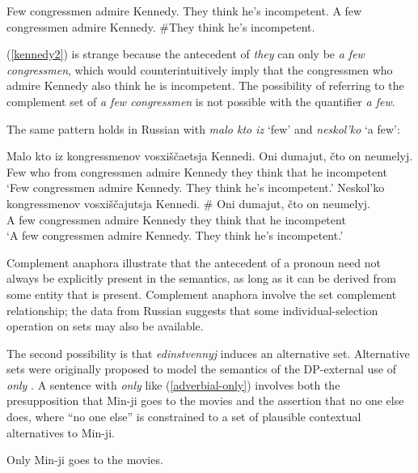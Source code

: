 \begin{exe}
	\ex \label{kennedy} Few congressmen admire Kennedy. They think he's incompetent.
	\ex \label{kennedy2} A few congressmen admire Kennedy. \#They think he's incompetent.
\end{exe}

(\ref{kennedy2}) is strange because the antecedent of \textit{they} can only be \textit{a few congressmen}, which would counterintuitively imply that the congressmen who admire Kennedy also think he is incompetent. The possibility of referring to the complement set of \textit{a few congressmen} is not possible with the quantifier \textit{a few}.

The same pattern holds in Russian with \textit{malo kto iz} `few' and \textit{neskol'ko} `a few':

\begin{exe}
	\ex \gll Malo kto iz kongressmenov vosxi\v{s}\v{c}aetsja Kennedi. Oni dumajut, \v{c}to on neumelyj.\\
	Few who from congressmen admire Kennedy they think that he incompetent\\
	\glt `Few congressmen admire Kennedy. They think he's incompetent.'
	\ex \gll Neskol'ko kongressmenov vosxi\v{s}\v{c}ajutsja Kennedi. \# Oni dumajut, \v{c}to on neumelyj.\\
	{A few} congressmen admire Kennedy {} they think that he incompetent\\
	\glt `A few congressmen admire Kennedy. They think he's incompetent.'
\end{exe}

Complement anaphora illustrate that the antecedent of a pronoun need not always be explicitly present in the semantics, as long as it can be derived from some entity that is present. Complement anaphora involve the set complement relationship; the data from Russian suggests that some individual-selection operation on sets may also be available.

The second possibility is that \textit{edinstvennyj} induces an alternative set. Alternative sets were originally proposed to model the semantics of the DP-external use of \textit{only} \citep{rooth85, rooth92}.
A sentence with \textit{only} like (\ref{adverbial-only}) involves both the presupposition that Min-ji goes to the movies and the assertion that no one else does, where ``no one else'' is constrained to a set of plausible contextual alternatives to Min-ji.

\begin{exe}
	\ex \label{adverbial-only} Only Min-ji goes to the movies.
\end{exe}

